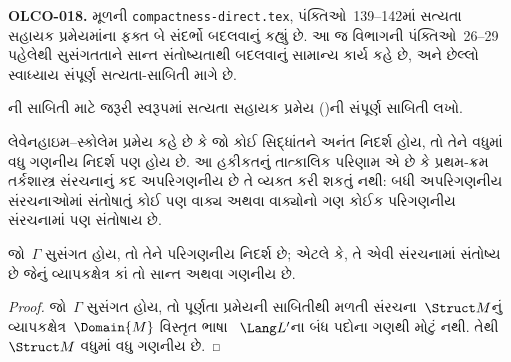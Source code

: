 \begin{editorial}
\textbf{OLCO-018.} મૂળની \texttt{compactness-direct.tex}, પંક્તિઓ~139--142માં સત્યતા સહાયક પ્રમેયમાંના ફક્ત બે સંદર્ભો બદલવાનું કહ્યું છે. આ જ વિભાગની પંક્તિઓ~26--29 પહેલેથી સુસંગતતાને સાન્ત સંતોષ્યતાથી બદલવાનું સામાન્ય કાર્ય કહે છે, અને છેલ્લો સ્વાધ્યાય સંપૂર્ણ સત્યતા-સાબિતી માગે છે.
\end{editorial}




\begin{prob}
ની સાબિતી માટે જરૂરી
સ્વરૂપમાં સત્યતા સહાયક પ્રમેય
()ની સંપૂર્ણ સાબિતી લખો.
\end{prob}
\endgroup


%
  \begingroup
\makeatletter{}\makeatother

\label{guunit:OLP-0137}


લેવેનહાઇમ--સ્કોલેમ પ્રમેય કહે છે કે જો કોઈ સિદ્ધાંતને અનંત નિદર્શ
હોય, તો તેને વધુમાં વધુ ગણનીય નિદર્શ પણ હોય છે. આ હકીકતનું
તાત્કાલિક પરિણામ એ છે કે પ્રથમ-ક્રમ તર્કશાસ્ત્ર સંરચનાનું કદ
અપરિગણનીય છે તે વ્યક્ત કરી શકતું નથી: બધી અપરિગણનીય
સંરચનાઓમાં સંતોષાતું કોઈ પણ વાક્ય અથવા વાક્યોનો
ગણ કોઈક પરિગણનીય સંરચનામાં પણ સંતોષાય છે.

\begin{thm}
 જો~$\Gamma$ સુસંગત હોય, તો તેને
પરિગણનીય નિદર્શ છે; એટલે કે, તે એવી સંરચનામાં સંતોષ્ય
છે જેનું વ્યાપકક્ષેત્ર કાં તો સાન્ત અથવા ગણનીય છે.
\end{thm}

\begin{proof}
જો~$\Gamma$ સુસંગત હોય, તો પૂર્ણતા પ્રમેયની સાબિતીથી મળતી
સંરચના~$\Struct M$નું વ્યાપકક્ષેત્ર~$\Domain{M}$ વિસ્તૃત ભાષા
~$\Lang L'$ના બંધ પદોના ગણથી મોટું નથી. તેથી~$\Struct M$ વધુમાં વધુ
ગણનીય છે.
\end{proof}


